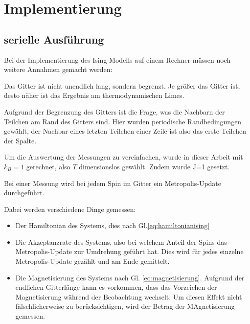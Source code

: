 \documentclass{scrreprt}
\begin{document}
	\chapter{Implementierung}
	\label{chap:implementierung}
	
	\section{serielle Ausführung}
	\label{sec:seriellimplementierung}
	Bei der Implementierung des Ising-Modells auf einem Rechner müssen noch weitere Annahmen gemacht werden:
	
	Das Gitter ist nicht unendlich lang, sondern begrenzt. Je größer das Gitter ist, desto näher ist das Ergebnis am thermodynamischen Limes. 
	
	Aufgrund der Begrenzung des Gitters ist die Frage, was die Nachbarn der Teilchen am Rand des Gitters sind. Hier wurden periodische Randbedingungen gewählt, der Nachbar eines letzten Teilchen einer Zeile ist also das erste Teilchen der Spalte.
	
	Um die Auswertung der Messungen zu vereinfachen, wurde in dieser Arbeit mit $k_B=1$ gerechnet, also $T$ dimensionslos gewählt. Zudem wurde J=1 gesetzt.
	
	Bei einer Messung wird bei jedem Spin im Gitter ein Metropolis-Update durchgeführt.%
	
	Dabei werden verschiedene Dinge gemessen: \begin{itemize}
		\item Der Hamiltonian des Systems, dies nach Gl.\ref{eq:hamiltonianising}
		\item Die Akzeptanzrate des Systems, also bei welchem Anteil der Spins das Metropolis-Update zur Umdrehung geführt hat. Dies wird für jedes einzelne Metropolis-Update gezählt und am Ende gemittelt.
		\item Die Magnetisierung des Systems nach Gl. \ref{eq:magnetisierung}. Aufgrund der endlichen Gitterlänge kann es vorkommen, dass das Vorzeichen der Magnetisierung während der Beobachtung wechselt. Um diesen Effekt nicht fälschlicherweise zu berücksichtigen, wird der Betrag der MAgnetisierung gemessen. \cite[vgl. ][Abschn. 2.3.3]{binderherrmann}
	\end{itemize}
	
\end{document}
